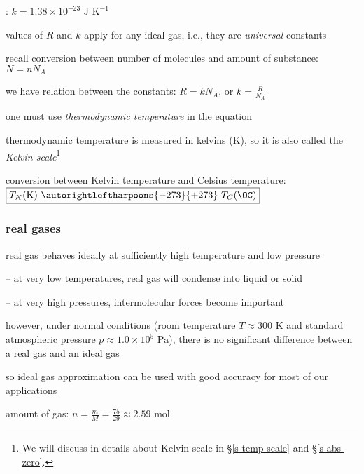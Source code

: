 : $k=1.38\times10^{-23} \text{ J K}^{-1}$

values of $R$ and $k$ apply for any ideal gas, i.e., they are \emph{universal} constants

\cmt recall conversion between number of molecules and amount of substance: $\boxed{N=nN_A}$

we have relation between the constants: $R = kN_A$, or $k=\frac{R}{N_A}$

\cmt one must use \emph{thermodynamic temperature} in the equation

thermodynamic temperature is measured in kelvins (K), so it is also called the \emph{Kelvin scale}\footnote{We will discuss in details about Kelvin scale in \S\ref{s-temp-scale} and \S\ref{s-abs-zero}.}

conversion between Kelvin temperature and Celsius temperature: $\boxed{T_K (\text{K}) \text{ } \autorightleftharpoons{\footnotesize -273}{\footnotesize +273} \text{ } T_C (\OC)}$

\subsubsection*{real gases}

real gas behaves ideally at sufficiently high temperature and low pressure

\begin{compactitem}
	\item[--] at very low temperatures, real gas will condense into liquid or solid
	
	\item[--] at very high pressures, intermolecular forces become important
\end{compactitem}

however, under normal conditions (room temperature $T \approx 300 \text{ K}$ and standard atmospheric pressure $p \approx 1.0\times10^5 \text{ Pa}$), there is no significant difference between a real gas and an ideal gas

so ideal gas approximation can be used with good accuracy for most of our applications


\sol amount of gas: $n=\frac{m}{M} = \frac{75}{29} \approx 2.59 \text{ mol}$

